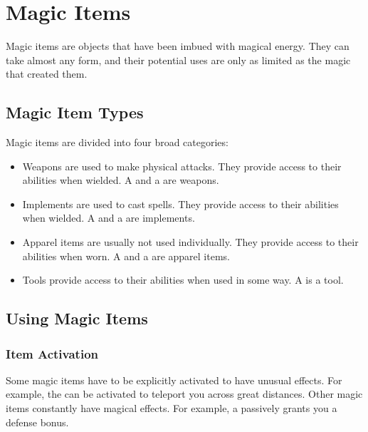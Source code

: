 \chapter{Magic Items}

Magic items are objects that have been imbued with magical energy. They can take almost any form, and their potential uses are only as limited as the magic that created them.

\section{Magic Item Types}
    Magic items are divided into four broad categories:
    \begin{itemize}
        \item Weapons are used to make physical attacks. They provide access to their abilities when wielded.
            A  and a  are weapons.
        \item Implements are used to cast spells. They provide access to their abilities when wielded.
            A  and a  are implements.
        \item Apparel items are usually not used individually. They provide access to their abilities when worn.
            A  and a  are apparel items.
        \item Tools provide access to their abilities when used in some way.
            A  is a tool.
    \end{itemize}

\section{Using Magic Items}

    \subsection{Item Activation}

        Some magic items have to be explicitly activated to have unusual effects.
        For example, the  can be activated to teleport you across great distances.
        Other magic items constantly have magical effects.
        For example, a  passively grants you a defense bonus.

